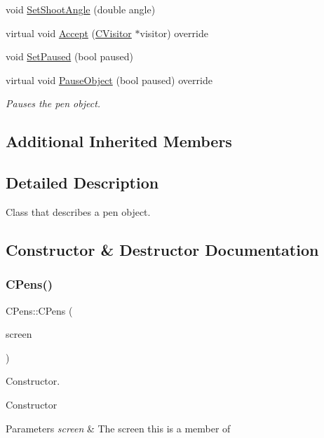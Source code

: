\begin{DoxyCompactItemize}
\item 
void \mbox{\hyperlink{class_c_pens_a1f2dbffbe8ff484a1c4c2bccf87fddda}{Set\+Shoot\+Angle}} (double angle)
\item 
virtual void \mbox{\hyperlink{class_c_pens_a054fe093d31223c2ad66ab328e158f33}{Accept}} (\mbox{\hyperlink{class_c_visitor}{C\+Visitor}} $\ast$visitor) override
\item 
void \mbox{\hyperlink{class_c_pens_ad028040c46be13e70983b497751c4741}{Set\+Paused}} (bool paused)
\item 
virtual void \mbox{\hyperlink{class_c_pens_ac7f21709db467d9cb2c30f814d391edf}{Pause\+Object}} (bool paused) override
\begin{DoxyCompactList}\small\item\em Pauses the pen object. \end{DoxyCompactList}\end{DoxyCompactItemize}
\subsection*{Additional Inherited Members}


\subsection{Detailed Description}
Class that describes a pen object. 

\subsection{Constructor \& Destructor Documentation}
\mbox{\label{class_c_pens_af7d7b1e969d038c385998bca870cb854}} 
\subsubsection{\texorpdfstring{CPens()}{CPens()}}
{\footnotesize\ttfamily C\+Pens\+::\+C\+Pens (\begin{DoxyParamCaption}\item[{\mbox{\hyperlink{class_c_screen}{C\+Screen}} $\ast$}]{screen }\end{DoxyParamCaption})}



Constructor. 

Constructor 
\begin{DoxyParams}{Parameters}
{\em screen} & The screen this is a member of \\
\hline
\end{DoxyParams}


